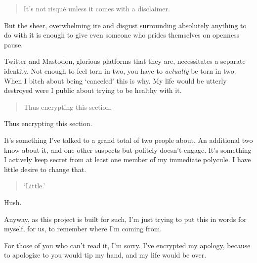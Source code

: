 \begin{quote}
It's not risqué unless it comes with a disclaimer.
\end{quote}

But the sheer, overwhelming ire and disgust surrounding absolutely anything to do with it is enough to give even someone who prides themselves on openness pause.

Twitter and Mastodon, glorious platforms that they are, necessitates a separate identity. Not enough to feel torn in two, you have to \emph{actually} be torn in two. When I bitch about being `canceled' this is why. My life would be utterly destroyed were I public about trying to be healthy with it.

\begin{quote}
Thus encrypting this section.
\end{quote}

Thus encrypting this section.

It's something I've talked to a grand total of two people about. An additional two know about it, and one other suspects but politely doesn't engage. It's something I actively keep secret from at least one member of my immediate polycule. I have little desire to change that.

\begin{quote}
`Little.'
\end{quote}

Hush.

Anyway, as this project is built for such, I'm just trying to put this in words for myself, for us, to remember where I'm coming from.

For those of you who can't read it, I'm sorry. I've encrypted my apology, because to apologize to you would tip my hand, and my life would be over.
